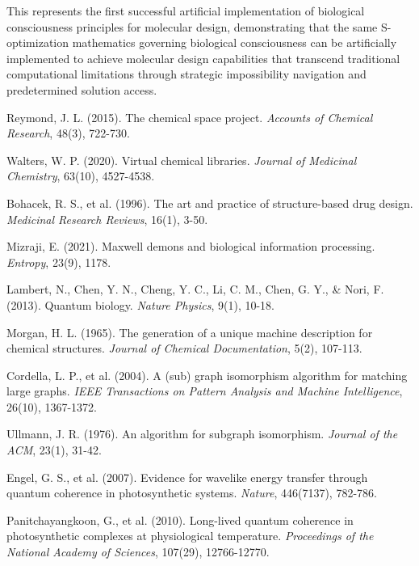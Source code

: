 \documentclass[11pt,a4paper]{article}
\begin{document}
This represents the first successful artificial implementation of biological consciousness principles for molecular design, demonstrating that the same S-optimization mathematics governing biological consciousness can be artificially implemented to achieve molecular design capabilities that transcend traditional computational limitations through strategic impossibility navigation and predetermined solution access.

\begin{thebibliography}{99}

Reymond, J. L. (2015). The chemical space project. \textit{Accounts of Chemical Research}, 48(3), 722-730.

Walters, W. P. (2020). Virtual chemical libraries. \textit{Journal of Medicinal Chemistry}, 63(10), 4527-4538.

Bohacek, R. S., et al. (1996). The art and practice of structure-based drug design. \textit{Medicinal Research Reviews}, 16(1), 3-50.

Mizraji, E. (2021). Maxwell demons and biological information processing. \textit{Entropy}, 23(9), 1178.

Lambert, N., Chen, Y. N., Cheng, Y. C., Li, C. M., Chen, G. Y., \& Nori, F. (2013). Quantum biology. \textit{Nature Physics}, 9(1), 10-18.

Morgan, H. L. (1965). The generation of a unique machine description for chemical structures. \textit{Journal of Chemical Documentation}, 5(2), 107-113.

Cordella, L. P., et al. (2004). A (sub) graph isomorphism algorithm for matching large graphs. \textit{IEEE Transactions on Pattern Analysis and Machine Intelligence}, 26(10), 1367-1372.

Ullmann, J. R. (1976). An algorithm for subgraph isomorphism. \textit{Journal of the ACM}, 23(1), 31-42.

Engel, G. S., et al. (2007). Evidence for wavelike energy transfer through quantum coherence in photosynthetic systems. \textit{Nature}, 446(7137), 782-786.

Panitchayangkoon, G., et al. (2010). Long-lived quantum coherence in photosynthetic complexes at physiological temperature. \textit{Proceedings of the National Academy of Sciences}, 107(29), 12766-12770.


\end{thebibliography}
\end{document}
